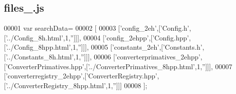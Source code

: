 \subsection{files\+\_.\+js}
\label{files__0_8js_source}

\begin{DoxyCode}
00001 var searchData=
00002 [
00003   [\textcolor{stringliteral}{'config\_2eh'},[\textcolor{stringliteral}{'Config.h'},[\textcolor{stringliteral}{'../Config\_8h.html'},1,\textcolor{stringliteral}{''}]]],
00004   [\textcolor{stringliteral}{'config\_2ehpp'},[\textcolor{stringliteral}{'Config.hpp'},[\textcolor{stringliteral}{'../Config\_8hpp.html'},1,\textcolor{stringliteral}{''}]]],
00005   [\textcolor{stringliteral}{'constants\_2eh'},[\textcolor{stringliteral}{'Constants.h'},[\textcolor{stringliteral}{'../Constants\_8h.html'},1,\textcolor{stringliteral}{''}]]],
00006   [\textcolor{stringliteral}{'converterprimatives\_2ehpp'},[\textcolor{stringliteral}{'ConverterPrimatives.hpp'},[\textcolor{stringliteral}{'../ConverterPrimatives\_8hpp.html'},1,\textcolor{stringliteral}{''}]]],
00007   [\textcolor{stringliteral}{'converterregistry\_2ehpp'},[\textcolor{stringliteral}{'ConverterRegistry.hpp'},[\textcolor{stringliteral}{'../ConverterRegistry\_8hpp.html'},1,\textcolor{stringliteral}{''}]]]
00008 ];
\end{DoxyCode}
